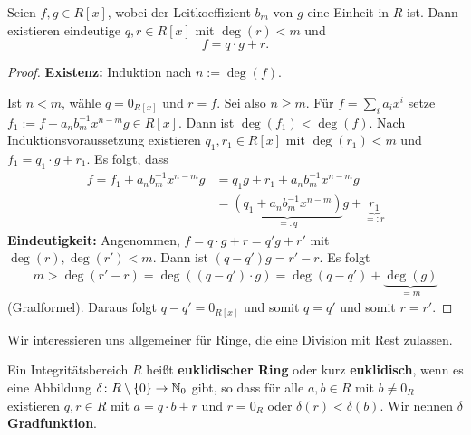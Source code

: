 \begin{satz}\label{satz5_10}
	Seien $f,g \in R[x]$, wobei der Leitkoeffizient $b_m$ von $g$ eine Einheit in $R$ ist. Dann existieren eindeutige $q,r \in R[x]$ mit $\deg(r) < m$ und
	\[f = q \cdot g + r.\]
\end{satz}
\begin{proof}
	\textbf{Existenz: } Induktion nach $n := \deg(f)$.
	
	Ist $n < m$, wähle $q = 0_{R[x]}$ und $r=f$. Sei also $n \geq m$. Für $f = \sum_i a_i x^i$ setze $f_1 := f - a_n b_m^{-1} x^{n-m} g \in R[x]$. Dann ist $\deg(f_1) < \deg(f)$. Nach Induktionsvoraussetzung existieren $q_1, r_1 \in R[x]$ mit $\deg(r_1) < m$ und $f_1 = q_1 \cdot g + r_1$. Es folgt, dass 
	\begin{align*}
	f = f_1 + a_n b_m^{-1} x^{n-m} g &= q_1 g + r_1 + a_n b_m^{-1} x^{n-m} g\\
	&= 	\underbrace{(q_1 + a_n b_m^{-1} x^{n-m})}_{=: q} g + \underbrace{r_1}_{=:r}
	\end{align*}
	\textbf{Eindeutigkeit: } Angenommen, $f = q\cdot g + r = q' g + r'$ mit $\deg(r), \deg(r') < m$. Dann ist $(q- q')g = r' - r$. Es folgt 
	\begin{align*}
		m > \deg(r'-r) = \deg((q - q')\cdot g) = \deg(q-q') + \underbrace{\deg(g)}_{=m}
	\end{align*}
	(Gradformel). Daraus folgt $q-q' = 0_{R[x]}$ und somit $q = q'$ und somit $r=r'$.
\end{proof}
Wir interessieren uns allgemeiner für Ringe, die eine Division mit Rest zulassen.
\begin{definition}
	Ein Integritätsbereich $R$ heißt \textbf{euklidischer Ring} oder kurz \textbf{euklidisch}, wenn es eine Abbildung $\delta \colon R \setminus \{0\} \to \mathbb{N}_0$ gibt, so dass für alle $a,b \in R$ mit $b\neq 0_R$ existieren $q,r \in R$ mit $a = q\cdot b + r$ und $r= 0_R$ oder $\delta(r) < \delta(b)$. Wir nennen $\delta$ \textbf{Gradfunktion}.
\end{definition}
